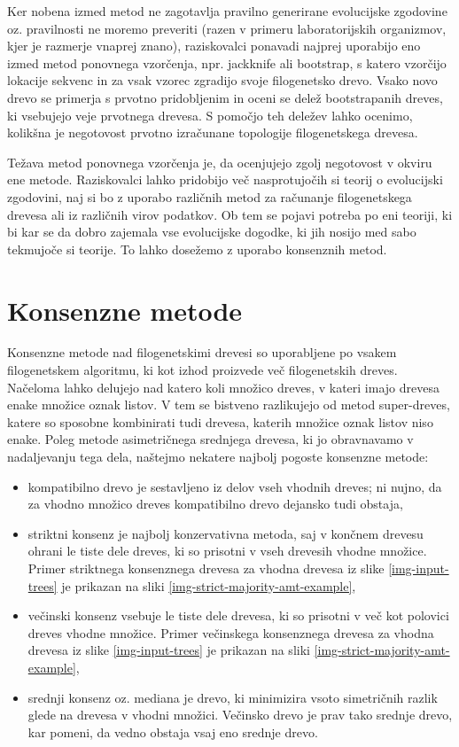 \documentclass[a4paper, 12pt]{book}
\begin{document}
Ker nobena izmed metod ne zagotavlja pravilno generirane evolucijske zgodovine oz. pravilnosti ne moremo preveriti (razen v primeru laboratorijskih organizmov, kjer je razmerje vnaprej znano)\cite{phy}, raziskovalci ponavadi najprej uporabijo eno izmed metod ponovnega vzorčenja, npr. jackknife ali bootstrap, s katero vzorčijo lokacije sekvenc in za vsak vzorec zgradijo svoje filogenetsko drevo. Vsako novo drevo se primerja s prvotno pridobljenim in oceni se delež bootstrapanih dreves, ki vsebujejo veje prvotnega drevesa. S pomočjo teh deležev lahko ocenimo, kolikšna je negotovost prvotno izračunane topologije filogenetskega drevesa\cite{fel}.   

Težava metod ponovnega vzorčenja je, da ocenjujejo zgolj negotovost v okviru ene metode. Raziskovalci lahko pridobijo več nasprotujočih si teorij o evolucijski zgodovini, naj si bo z uporabo različnih metod za računanje filogenetskega drevesa ali iz različnih virov podatkov. Ob tem se pojavi potreba po eni teoriji, ki bi kar se da dobro zajemala vse evolucijske dogodke, ki jih nosijo med sabo tekmujoče si teorije. To lahko dosežemo z uporabo konsenznih metod.

\section{Konsenzne metode}
Konsenzne metode nad filogenetskimi drevesi so uporabljene po vsakem filogenetskem algoritmu, ki kot izhod proizvede več filogenetskih dreves. Načeloma lahko delujejo nad katero koli množico dreves, v kateri imajo drevesa enake množice oznak listov. V tem se bistveno razlikujejo od metod super-dreves, katere so sposobne kombinirati tudi drevesa, katerih množice oznak listov niso enake\cite{bw}. Poleg metode asimetričnega srednjega drevesa, ki jo obravnavamo v nadaljevanju tega dela, naštejmo nekatere najbolj pogoste konsenzne metode:

\begin{itemize}
	\item kompatibilno drevo je sestavljeno iz delov vseh vhodnih dreves; ni nujno, da za vhodno množico dreves kompatibilno drevo dejansko tudi obstaja\cite{pw},
	\item striktni konsenz je najbolj konzervativna metoda, saj v končnem drevesu ohrani le tiste dele dreves, ki so prisotni v vseh drevesih vhodne množice\cite{bw}. Primer striktnega konsenznega drevesa za vhodna drevesa iz slike \ref{img-input-trees} je prikazan na sliki \ref{img-strict-majority-amt-example},
	\item večinski konsenz vsebuje le tiste dele drevesa, ki so prisotni v več kot polovici dreves vhodne množice\cite{bw}. Primer večinskega konsenznega drevesa za vhodna drevesa iz slike \ref{img-input-trees} je prikazan na sliki \ref{img-strict-majority-amt-example},
	\item srednji konsenz oz. mediana je drevo, ki minimizira vsoto simetričnih razlik glede na drevesa v vhodni množici. Večinsko drevo je prav tako srednje drevo, kar pomeni, da vedno obstaja vsaj eno srednje drevo\cite{pw}.
\end{itemize}
\end{document}
